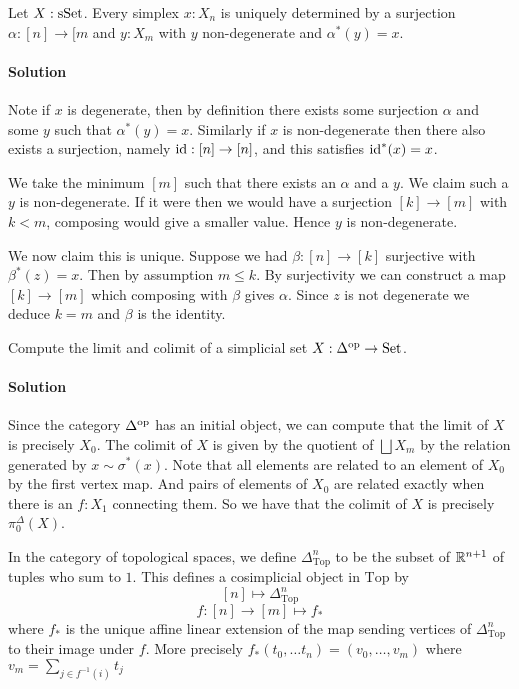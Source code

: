 \begin{exercise}
    Let $X : \mathrm{sSet}$.
    Every simplex $x : X_n$ is uniquely determined by a surjection $\alpha : [n] \to [m$ and $y : X_m$ with $y$ non-degenerate and $\alpha^*(y) = x$.

    \paragraph{Solution}
    Note if $x$ is degenerate, then by definition there exists some surjection $\alpha$ and some $y$ such that $\alpha^*(y) = x$.
    Similarly if $x$ is non-degenerate then there also exists a surjection, namely $\mathrm{id} : [n] \to [n]$, and this satisfies $\mathrm{id}^*(x) = x$.

    We take the minimum $[m]$ such that there exists an $\alpha$ and a $y$.
    We claim such a $y$ is non-degenerate. If it were then we would have a surjection $[k] \to [m]$ with $k < m$, composing would give a smaller value.
    Hence $y$ is non-degenerate.

    We now claim this is unique. Suppose we had $\beta : [n] \to [k]$ surjective with $\beta^*(z) = x$.
    Then by assumption $m \leq k$.
    By surjectivity we can construct a map $[k] \to [m]$ which composing with $\beta$ gives $\alpha$.
    Since $z$ is not degenerate we deduce $k = m$ and $\beta$ is the identity.
\end{exercise}

\begin{exercise}
    Compute the limit and colimit of a simplicial set $X : \Delta^{\mathrm{op}} \to \mathrm{Set}$.

    \paragraph{Solution} Since the category $\Delta^{\mathrm{op}}$ has an initial object, we can compute that the limit of $X$ is precisely $X_0$.
    The colimit of $X$ is given by the quotient of $\bigsqcup X_m$ by the relation generated by $x \sim \sigma^*(x)$. 
    Note that all elements are related to an element of $X_0$ by the first vertex map. 
    And pairs of elements of $X_0$ are related exactly when there is an $f : X_1$ connecting them.
    So we have that the colimit of $X$ is precisely $\pi_0^\Delta(X)$.
\end{exercise}

\begin{definition}
    In the category of topological spaces, we define $\Delta^n_\mathrm{Top}$ to be the subset of $\mathbb{R}^{n+1}$ of tuples who sum to $1$.
    This defines a cosimplicial object in $\mathrm{Top}$ by 
    \[ [n] \mapsto \Delta^n_{\mathrm{Top}} \]
    \[ f : [n] \to [m] \mapsto f_*\]
    where $f_*$ is the unique affine linear extension of the map sending vertices of $\Delta^n_{\mathrm{Top}}$ to their image under $f$.
    More precisely $ f_*(t_0, \ldots t_n) = (v_0, \ldots, v_m) $ where 
    $ v_m = \sum_{j \in f^{-1}(i)} t_j $
\end{definition}


